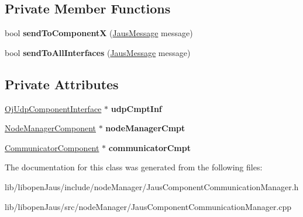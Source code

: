 \subsection*{\-Private \-Member \-Functions}
\begin{DoxyCompactItemize}
\item 
\hypertarget{class_jaus_component_communication_manager_a24ddc0054acf95b34c4ef266b756812d}{bool {\bfseries send\-To\-Component\-X} (\hyperlink{struct_jaus_message_struct}{\-Jaus\-Message} message)}\label{class_jaus_component_communication_manager_a24ddc0054acf95b34c4ef266b756812d}

\item 
\hypertarget{class_jaus_component_communication_manager_a99c02fb3df424e66bcc243ca600e2f3c}{bool {\bfseries send\-To\-All\-Interfaces} (\hyperlink{struct_jaus_message_struct}{\-Jaus\-Message} message)}\label{class_jaus_component_communication_manager_a99c02fb3df424e66bcc243ca600e2f3c}

\end{DoxyCompactItemize}
\subsection*{\-Private \-Attributes}
\begin{DoxyCompactItemize}
\item 
\hypertarget{class_jaus_component_communication_manager_aee3f3eff5e822c6ae835f8ae468126ce}{\hyperlink{class_oj_udp_component_interface}{\-Oj\-Udp\-Component\-Interface} $\ast$ {\bfseries udp\-Cmpt\-Inf}}\label{class_jaus_component_communication_manager_aee3f3eff5e822c6ae835f8ae468126ce}

\item 
\hypertarget{class_jaus_component_communication_manager_a8540110c37a1a20b1fbbe9ce0ed94bf3}{\hyperlink{class_node_manager_component}{\-Node\-Manager\-Component} $\ast$ {\bfseries node\-Manager\-Cmpt}}\label{class_jaus_component_communication_manager_a8540110c37a1a20b1fbbe9ce0ed94bf3}

\item 
\hypertarget{class_jaus_component_communication_manager_a78f624c844b48666998ec71a08326d37}{\hyperlink{class_communicator_component}{\-Communicator\-Component} $\ast$ {\bfseries communicator\-Cmpt}}\label{class_jaus_component_communication_manager_a78f624c844b48666998ec71a08326d37}

\end{DoxyCompactItemize}


\-The documentation for this class was generated from the following files\-:\begin{DoxyCompactItemize}
\item 
lib/libopen\-Jaus/include/node\-Manager/\-Jaus\-Component\-Communication\-Manager.\-h\item 
lib/libopen\-Jaus/src/node\-Manager/\-Jaus\-Component\-Communication\-Manager.\-cpp\end{DoxyCompactItemize}
